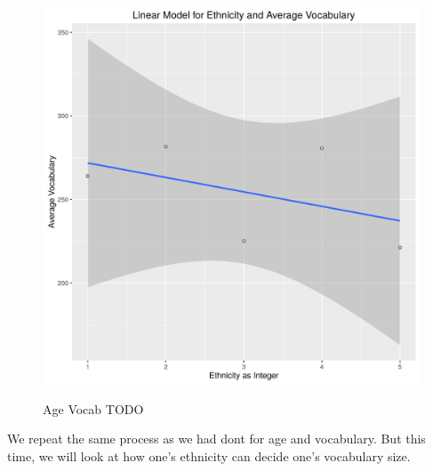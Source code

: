 \documentclass[11pt]{article}  %
\begin{document}
\begin{figure}[h]
\centering
\caption{Age Vocab TODO}
\includegraphics[scale=.50]{means_ethn}
\label{}
\end{figure}

\indent We repeat the same process as we had dont for age and vocabulary. But this time, we will look at how one's ethnicity can decide one's vocabulary size.





\end{document}

